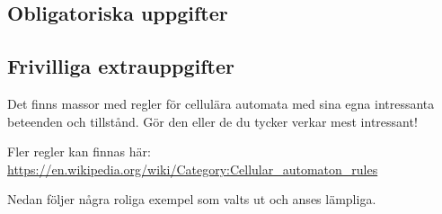 \subsection{Obligatoriska uppgifter}
	
    


    
    






\subsection{Frivilliga extrauppgifter}



    Det finns massor med regler för cellulära automata med sina egna intressanta beteenden och tillstånd.
    Gör den eller de du tycker verkar mest intressant!

    Fler regler kan finnas här: \url{https://en.wikipedia.org/wiki/Category:Cellular_automaton_rules}

    Nedan följer några roliga exempel som valts ut och anses lämpliga.

